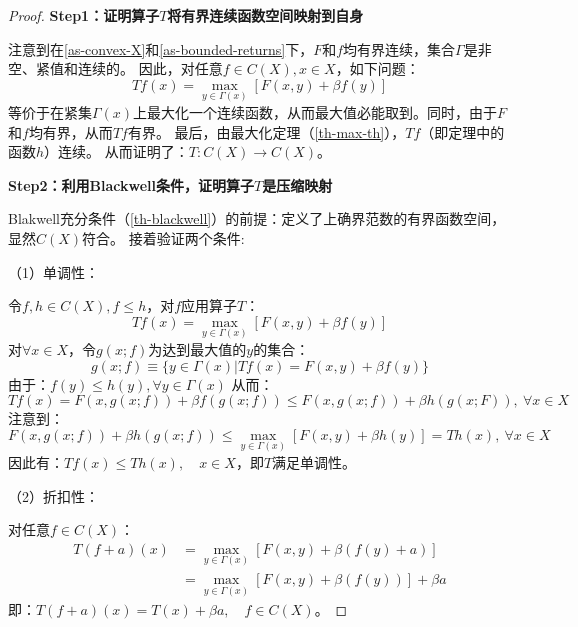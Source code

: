 \begin{proof}
    \textbf{Step1：证明算子$T$将有界连续函数空间映射到自身}

    注意到在\cref{as-convex-X}和\cref{as-bounded-returns}下，$F$和$f$均有界连续，集合$\Gamma$是非空、紧值和连续的。
    因此，对任意$f\in C\left(X\right), x\in X$，如下问题：
    \begin{equation*}
        Tf\left(x\right)=\max_{y\in\Gamma\left(x\right)}\left[F\left(x,y\right)+\beta f\left(y\right)\right]
    \end{equation*}
    等价于在紧集$\Gamma\left(x\right)$上最大化一个连续函数，从而最大值必能取到。同时，由于$F$和$f$均有界，从而$Tf$有界。
    最后，由最大化定理（\cref{th-max-th}），$Tf$（即定理中的函数$h$）连续。
    从而证明了：$T: C\left(X\right)\rightarrow C\left(X\right)$。

    \textbf{Step2：利用Blackwell条件，证明算子$T$是压缩映射}

    Blakwell充分条件（\cref{th-blackwell}）的前提：定义了上确界范数的有界函数空间，显然$C\left(X\right)$符合。
    接着验证两个条件:

    （1）单调性：

    令$f,h \in C\left(X\right), f\leq h$，对$f$应用算子$T$：
    $$Tf\left(x\right)=\max_{y\in \Gamma\left(x\right)}\left[F\left(x,y\right)+\beta f\left(y\right)\right]$$
    对$\forall x\in X$，令$g\left(x;f\right)$为达到最大值的$y$的集合：
    \begin{equation*}
        g\left(x;f\right) \equiv \{y\in\Gamma\left(x\right)|Tf\left(x\right)
            =F\left(x,y\right)+\beta f\left(y\right)\}
    \end{equation*}
    由于：$f\left(y\right)\leq h\left(y\right), \forall y\in \Gamma\left(x\right)$
    从而：
    \begin{equation*}
        Tf\left(x\right) = F\left(x,g\left(x;f\right)\right)+\beta f\left(g\left(x;f\right)\right)
            \leq F\left(x,g\left(x;f\right)\right)+\beta h\left(g\left(x;F\right)\right), ~\forall x\in X
    \end{equation*}
    注意到：
    \begin{equation*}
        F(x, g(x ; f))+\beta h(g(x ; f)) \leq 
            \max _{y \in \Gamma(x)}[F(x, y)+\beta h(y)]=T h(x), ~\forall x \in X
    \end{equation*}
    因此有：$Tf\left(x\right)\leq Th\left(x\right), \quad x\in X$，即$T$满足单调性。
    
    （2）折扣性：

    对任意$f\in C\left(X\right)$：
    \begin{equation*}
        \begin{aligned}
            T\left(f+a\right)\left(x\right) &= 
                \max_{y\in\Gamma\left(x\right)}\left[F\left(x,y\right) + 
                    \beta \left(f\left(y\right)+a\right)\right]  \\
            &= \max_{y\in\Gamma\left(x\right)}\left[F\left(x,y\right) + 
                \beta \left(f\left(y\right)\right)\right]+\beta a
        \end{aligned}
    \end{equation*}
    即：$T\left(f+a\right)\left(x\right)=T\left(x\right)+\beta a, \quad f\in C\left(X\right)$。


\end{proof}

